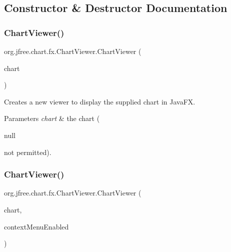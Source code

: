 \subsection{Constructor \& Destructor Documentation}
\mbox{\label{classorg_1_1jfree_1_1chart_1_1fx_1_1_chart_viewer_a4bccc9c8c5c2aafaae0150cbc6277b2d}} 
\subsubsection{\texorpdfstring{Chart\+Viewer()}{ChartViewer()}\hspace{0.1cm}{\footnotesize\ttfamily [1/2]}}
{\footnotesize\ttfamily org.\+jfree.\+chart.\+fx.\+Chart\+Viewer.\+Chart\+Viewer (\begin{DoxyParamCaption}\item[{\mbox{\hyperlink{classorg_1_1jfree_1_1chart_1_1_j_free_chart}{J\+Free\+Chart}}}]{chart }\end{DoxyParamCaption})}

Creates a new viewer to display the supplied chart in Java\+FX.


\begin{DoxyParams}{Parameters}
{\em chart} & the chart (
\begin{DoxyCode}
null 
\end{DoxyCode}
 not permitted). \\
\hline
\end{DoxyParams}
\mbox{\label{classorg_1_1jfree_1_1chart_1_1fx_1_1_chart_viewer_a7c8707565c8c0eef578822e811200d25}} 
\subsubsection{\texorpdfstring{Chart\+Viewer()}{ChartViewer()}\hspace{0.1cm}{\footnotesize\ttfamily [2/2]}}
{\footnotesize\ttfamily org.\+jfree.\+chart.\+fx.\+Chart\+Viewer.\+Chart\+Viewer (\begin{DoxyParamCaption}\item[{\mbox{\hyperlink{classorg_1_1jfree_1_1chart_1_1_j_free_chart}{J\+Free\+Chart}}}]{chart,  }\item[{boolean}]{context\+Menu\+Enabled }\end{DoxyParamCaption})}


